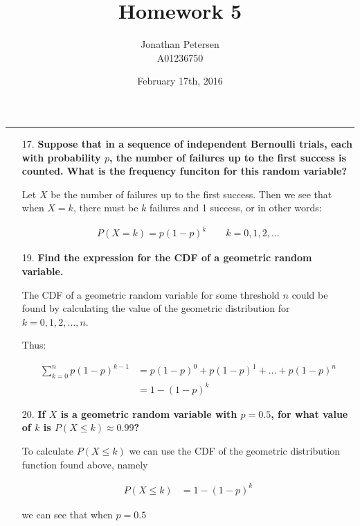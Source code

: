 \documentclass{article}
\title{Homework 5}
\author{Jonathan Petersen \\ A01236750}
\date{February 17th, 2016}
\begin{document}
	\maketitle
	\hrule
	\begin{enumerate}
		\item [17.] \textbf{Suppose that in a sequence of independent Bernoulli trials, each with 
						probability $p$, the number of failures up to the first success is counted.
						What is the frequency funciton for this random variable?}

			Let $X$ be the number of failures up to the first success. Then we see that when
			$X = k$, there must be $k$ failures and 1 success, or in other words:

				\begin{align*}
					P(X = k) = p(1 - p)^k \qquad k = 0, 1, 2, \dots
				\end{align*}

		\item [19.] \textbf{Find the expression for the CDF of a geometric random variable.}

			The CDF of a geometric random variable for some threshold $n$ could be found by 
			calculating the value of the geometric distribution for $k = 0, 1, 2, \dots, n$.

			Thus:

				\begin{align*}
					\sum_{k = 0}^{n} p(1-p)^{k-1} & = p(1-p)^0 + p(1-p)^1 + \dots + p(1-p)^n \\
						& = 1 - (1 - p)^k
				\end{align*}

		\item [20.]	\textbf{If $X$ is a geometric random variable with $p = 0.5$, for what value of
						$k$ is $P(X \le k) \approx{} 0.99$?}

			To calculate $P(X \le k)$ we can use the CDF of the geometric distribution function
			found above, namely

				\begin{align*}
					P(X \le k) & = 1 - (1 - p)^k
				\end{align*}

			we can see that when $p = 0.5$


\end{enumerate}
\end{document}
